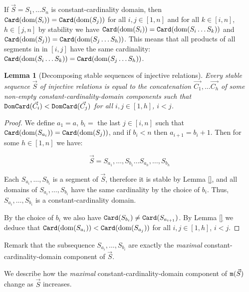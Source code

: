 \documentclass{lmcs}
\newtheorem{lemma}[theorem]{Lemma}
\begin{document}
If $\vec{S}=S_1, \ldots S_n$ is constant-cardinality domain, then ${\tt Card}({\rm dom}(S_i)) = {\tt Card}({\rm dom}(S_j))$ for all $i,j \in [1,n]$ and for all $k \in [i,n]$, $h \in [j,n]$ by
stability we have
${\tt Card}({\rm dom}(S_i)) ={\tt Card}({\rm dom}(S_i \ldots S_k))$ and
${\tt Card}({\rm dom}(S_j)) = {\tt Card}({\rm dom}(S_j \ldots S_h))$. This means that all products of
all segments in in $[i,j]$ have the same cardinality: 
${\tt Card}({\rm dom}(S_i \ldots S_k)) = {\tt Card}({\rm dom}(S_j \ldots S_h))$.

\begin{lemma}[Decomposing stable sequences of injective relations]
Every stable sequence $\vec{S}$ of injective relations is equal to the 
concatenation $\vec{C_1}, \ldots \vec{C_h}$
of some non-empty constant-cardinality-domain components 
such that ${\tt DomCard}(\vec{C_i})  < {\tt DomCard}(\vec{C_j})$ for all $i,j \in [1,h]$, $i < j$.
\end{lemma}

\begin{proof}
We define $a_1=a$, $b_i = $ the last $j \in [i,n]$ such that 
${\tt Card}({\rm dom}(S_{a_i})) = {\tt Card}({\rm dom}(S_j))$, and if $b_i<n$ then $a_{i+1}=b_i+1$.
Then for some $h \in [1,n]$ we have:

$$
\vec{S}
=
S_{a_1},\ldots,S_{b_1}
\ldots
S_{a_{h}},\ldots,S_{b_{h}}
$$

Each $S_{a_{i}},\ldots,S_{b_{i}}$ is a segment of $\vec{S}$, therefore it is stable
by Lemma \ref{}, and all domains of $S_{a_{i}},\ldots,S_{b_{i}}$ have the same cardinality 
by the choice of $b_i$. Thus, $S_{a_{i}},\ldots,S_{b_{i}}$ is a constant-cardinality domain. 

By the choice of $b_i$ we also have ${\tt Card}(S_{b_{i}}) \not = {\tt Card}(S_{a_{i+1}})$.
By Lemma \ref{} we deduce that
${\tt Card}({\rm dom}(S_{a_i})) < {\tt Card}({\rm dom}(S_{a_j}))$ for all $i,j \in [1,h]$, $i < j$.

\end{proof}

Remark that the subsequence $S_{a_{i}}, \ldots, S_{b_{i}}$ 
are exactly the \emph{maximal} constant-cardinality-domain component of $\vec{S}$.

We describe how the \emph{maximal} constant-cardinality-domain component of ${\tt m}(\vec{S})$ change as $\vec{S}$ increases.

\end{document}

